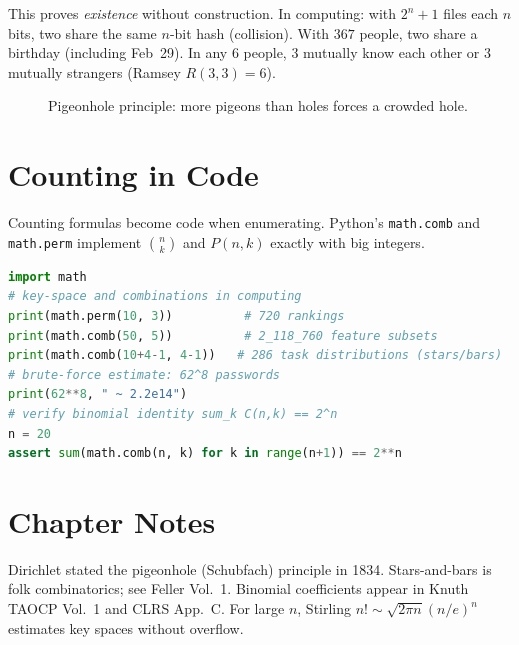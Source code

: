 This proves \emph{existence} without construction. In computing: with $2^n+1$ files each $n$ bits, two share the same $n$-bit hash (collision). With $367$ people, two share a birthday (including Feb~29). In any $6$ people, $3$ mutually know each other or $3$ mutually strangers (Ramsey $R(3,3)=6$).

\begin{figure}[h]
\centering
{}
\caption{Pigeonhole principle: more pigeons than holes forces a crowded hole.}
\label{fig:pigeonhole}
\end{figure}

\section{Counting in Code}
\label{sec:code-counting}
Counting formulas become code when enumerating. Python's \texttt{math.comb} and \texttt{math.perm} implement $\binom{n}{k}$ and $P(n,k)$ exactly with big integers.

\begin{lstlisting}[language=Python]
import math
# key-space and combinations in computing
print(math.perm(10, 3))          # 720 rankings
print(math.comb(50, 5))          # 2_118_760 feature subsets
print(math.comb(10+4-1, 4-1))   # 286 task distributions (stars/bars)
# brute-force estimate: 62^8 passwords
print(62**8, " ~ 2.2e14")
# verify binomial identity sum_k C(n,k) == 2^n
n = 20
assert sum(math.comb(n, k) for k in range(n+1)) == 2**n
\end{lstlisting}

\section{Chapter Notes}
Dirichlet stated the pigeonhole (Schubfach) principle in 1834. Stars-and-bars is folk combinatorics; see Feller Vol.~1. Binomial coefficients appear in Knuth TAOCP Vol.~1 and CLRS App.~C. For large $n$, Stirling $n!\sim\sqrt{2\pi n}(n/e)^n$ estimates key spaces without overflow.

